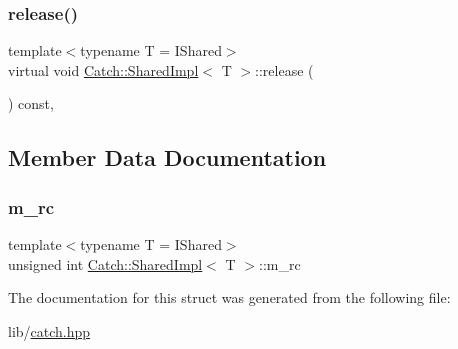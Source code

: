 \hypertarget{struct_catch_1_1_shared_impl_ada8052c6f24fd73ec099333626f106fe}{}\label{struct_catch_1_1_shared_impl_ada8052c6f24fd73ec099333626f106fe} 
\subsubsection{\texorpdfstring{release()}{release()}}
{\footnotesize\ttfamily template$<$typename T = I\+Shared$>$ \\
virtual void \hyperlink{struct_catch_1_1_shared_impl}{Catch\+::\+Shared\+Impl}$<$ T $>$\+::release (\begin{DoxyParamCaption}{ }\end{DoxyParamCaption}) const\hspace{0.3cm}{\ttfamily [inline]}, {\ttfamily [virtual]}}



\subsection{Member Data Documentation}
\hypertarget{struct_catch_1_1_shared_impl_a7e71ef1985b85aa41a1632f932a96bcb}{}\label{struct_catch_1_1_shared_impl_a7e71ef1985b85aa41a1632f932a96bcb} 
\subsubsection{\texorpdfstring{m\+\_\+rc}{m\_rc}}
{\footnotesize\ttfamily template$<$typename T = I\+Shared$>$ \\
unsigned int \hyperlink{struct_catch_1_1_shared_impl}{Catch\+::\+Shared\+Impl}$<$ T $>$\+::m\+\_\+rc\hspace{0.3cm}{\ttfamily [mutable]}}



The documentation for this struct was generated from the following file\+:\begin{DoxyCompactItemize}
\item 
lib/\hyperlink{catch_8hpp}{catch.\+hpp}\end{DoxyCompactItemize}
